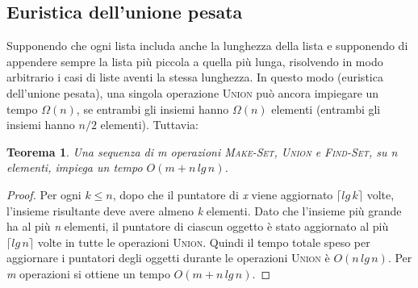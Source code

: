 \documentclass[10pt, a4paper]{report}
\newtheorem{theorem}{Teorema}[chapter]
\begin{document}
\subsection{Euristica dell'unione pesata}
Supponendo che ogni lista includa anche la lunghezza della lista e supponendo di appendere sempre la lista più piccola a quella più lunga, risolvendo in modo arbitrario i casi di liste aventi la stessa lunghezza. In questo modo (euristica dell'unione pesata), una singola operazione \textsc{Union} può ancora impiegare un tempo $\Omega(n)$, se entrambi gli insiemi hanno $\Omega(n)$ elementi (entrambi gli insiemi hanno $n/2$ elementi). Tuttavia:
\begin{theorem}
Una sequenza di \textit{m} operazioni \textsc{Make-Set}, \textsc{Union} e \textsc{Find-Set}, su \textit{n} elementi, impiega un tempo $O(m + n\,lg\,n)$.
\end{theorem}
\begin{proof}
Per ogni $k \leq n$, dopo che il puntatore di \textit{x} viene aggiornato $\lceil lg\,k \rceil$ volte, l'insieme risultante deve avere almeno \textit{k} elementi. Dato che l'insieme più grande ha al più \textit{n} elementi, il puntatore di ciascun oggetto è stato aggiornato al più $\lceil lg\,n \rceil$ volte in tutte le operazioni \textsc{Union}. Quindi il tempo totale speso per aggiornare i puntatori degli oggetti durante le operazioni \textsc{Union} è $O(n\,lg\,n)$. Per \textit{m} operazioni si ottiene un tempo $O(m + n\,lg\,n)$.
\end{proof}
\end{document}
